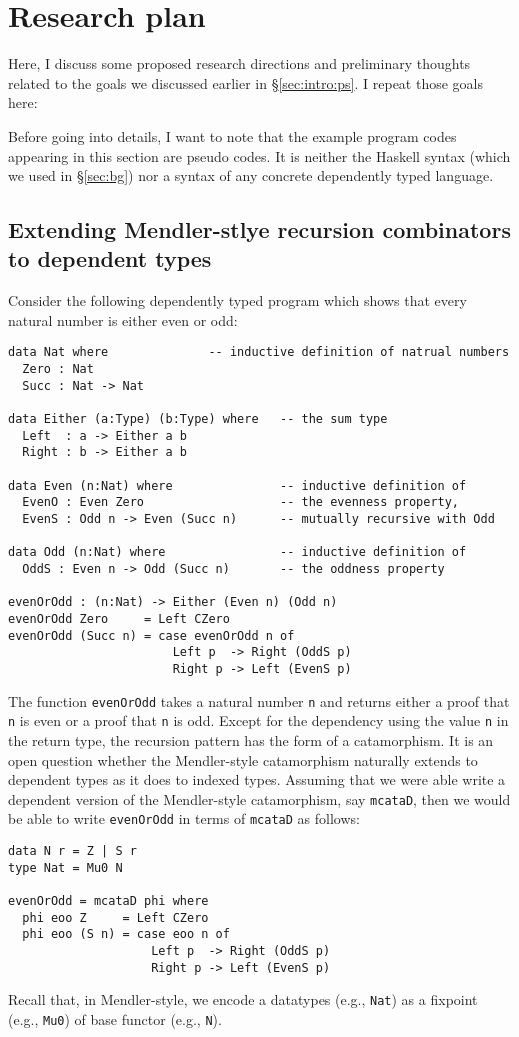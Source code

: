 \documentclass[letterpaper,12pt]{article}
\newcommand{\eg}[0]{e.g., }
\begin{document}
\section{Research plan} \label{sec:plan}
Here, I discuss some proposed research directions and preliminary thoughts
related to the goals we discussed earlier in \S\ref{sec:intro:ps}.
I repeat those goals here:\Goals


Before going into details, I want to note that the example program codes
appearing in this section are pseudo codes. It is neither the Haskell syntax
(which we used in \S\ref{sec:bg}) nor a syntax of any concrete
dependently typed language.

\subsection{Extending Mendler-stlye recursion combinators to dependent types}
\label{sec:plan:depty}
Consider the following dependently typed program
which shows that every natural number is either even or odd:
\begin{verbatim}
data Nat where              -- inductive definition of natrual numbers
  Zero : Nat
  Succ : Nat -> Nat

data Either (a:Type) (b:Type) where   -- the sum type
  Left  : a -> Either a b
  Right : b -> Either a b

data Even (n:Nat) where               -- inductive definition of
  EvenO : Even Zero                   -- the evenness property,
  EvenS : Odd n -> Even (Succ n)      -- mutually recursive with Odd

data Odd (n:Nat) where                -- inductive definition of
  OddS : Even n -> Odd (Succ n)       -- the oddness property

evenOrOdd : (n:Nat) -> Either (Even n) (Odd n)
evenOrOdd Zero     = Left CZero
evenOrOdd (Succ n) = case evenOrOdd n of
                       Left p  -> Right (OddS p)
                       Right p -> Left (EvenS p)
\end{verbatim}
The function \verb|evenOrOdd| takes a natural number \verb|n| and
returns either a proof that \verb|n| is even or a proof that \verb|n| is odd.
Except for the dependency using the value \verb|n| in the return type,
the recursion pattern has the form of a catamorphism.
It is an open question whether the Mendler-style catamorphism naturally extends
to dependent types as it does to indexed types.
Assuming that we were able write a dependent version of the Mendler-style
catamorphism, say \verb|mcataD|, then we would be able to write
\verb|evenOrOdd| in terms of \verb|mcataD| as follows:
\begin{verbatim}
data N r = Z | S r
type Nat = Mu0 N

evenOrOdd = mcataD phi where
  phi eoo Z     = Left CZero
  phi eoo (S n) = case eoo n of
                    Left p  -> Right (OddS p)
                    Right p -> Left (EvenS p)
\end{verbatim}
Recall that, in Mendler-style, we encode a datatypes (\eg \verb|Nat|)
as a fixpoint (\eg \verb|Mu0|) of base functor (\eg \verb|N|).
\end{document}
